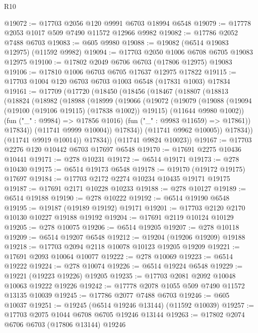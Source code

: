 \begin{lexlean}{R10}
\begin{coremodule}
@19072 := @17703 @2056 @120 @9991 @6703 @18994 @6548
@19079 := @17778 @2053 @1017 @509 @7490 @11572 @12966 @9982
@19082 := @17786 @2052 @7488 @6703
@19083 := @605 @9980
@19088 := @19082 (@6514 @19083 @12975) (@11592 @9982)
@19094 := @17703 @2050 @1006 @6708 @6705 @19083 @12975
@19100 := @17802 @2049 @6706 @6703 (@17806 @12975) @19083
@19106 := @17810 @1006 @6703 @6705 @17637 @12975 @17822
@19115 := @17703 @1004 @120 @6703 @6703 @1003 @6548 (@17831 @1003) @17834
@19161 := @17709
    (@17720
      (@18450
        (@18456
          (@18467
            (@18807
              (@18813
                (@18824
                  (@18982
                    (@18988
                      (@18999
                        (@19066
                          (@19072
                            (@19079
                              (@19088
                                (@19094 (@19100 (@19106 @19115) (@17838 @1002)) @19115)
                                (@11644 @9980 @1002))
                              (fun ("_" : @9984) => @17856 @1016)
                              (fun ("_" : @9983 @11659) => @17861))
                            @17834))
                        (@11741 @9999 @10004))
                      @17834))
                  (@11741 @9962 @10005))
                @17834))
            (@11741 @9919 @10014))
          @17834))
      (@11741 @9824 @10023))
@19167 := @17703 @2276 @120 @10442 @6703 @17697 @6548
@19170 := @17691 @2275 @10436 @10441
@19171 := @278 @10231
@19172 := @6514 @19171
@19173 := @278 @10430
@19175 := @6514 @19173 @6548
@19178 := @19170 (@19172 @19175) @17697
@19184 := @17703 @2172 @2274 @10234 @10435 @19171 @19175
@19187 := @17691 @2171 @10228 @10233
@19188 := @278 @10127
@19189 := @6514 @19188
@19190 := @278 @10222
@19192 := @6514 @19190 @6548
@19195 := @19187 (@19189 @19192) @19171
@19201 := @17703 @2120 @2170 @10130 @10227 @19188 @19192
@19204 := @17691 @2119 @10124 @10129
@19205 := @278 @10075
@19206 := @6514 @19205
@19207 := @278 @10118
@19209 := @6514 @19207 @6548
@19212 := @19204 (@19206 @19209) @19188
@19218 := @17703 @2094 @2118 @10078 @10123 @19205 @19209
@19221 := @17691 @2093 @10064 @10077
@19222 := @278 @10069
@19223 := @6514 @19222
@19224 := @278 @10074
@19226 := @6514 @19224 @6548
@19229 := @19221 (@19223 @19226) @19205
@19235 := @17703 @2081 @2092 @10048 @10063 @19222 @19226
@19242 := @17778 @2078 @1055 @509 @7490 @11572 @13135 @10039
@19245 := @17786 @2077 @7488 @6703
@19246 := @605 @10037
@19251 := @19245 (@6514 @19246 @13144) (@11592 @10039)
@19257 := @17703 @2075 @1044 @6708 @6705 @19246 @13144
@19263 := @17802 @2074 @6706 @6703 (@17806 @13144) @19246

\end{coremodule}
\end{lexlean}
